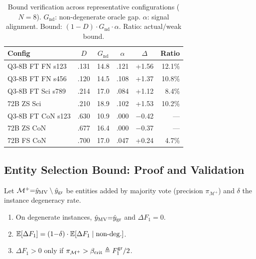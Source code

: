 \begin{table}[t]
\centering
\small
\caption{Bound verification across representative configurations ($N{=}8$). $G_{\text{nd}}$: non-degenerate oracle gap. $\alpha$: signal alignment. Bound: $(1{-}D) \cdot G_{\text{nd}} \cdot \alpha$. Ratio: actual$/$weak bound.}
\label{tab:bound_verification}
\begin{tabular}{@{}lccccr@{}}
\toprule
Config & $D$ & $G_{\text{nd}}$ & $\alpha$ & $\Delta$ & Ratio \\
\midrule
Q3-8B FT FN s123 & .131 & 14.8 & .121 & +1.56 & 12.1\% \\
Q3-8B FT FN s456 & .120 & 14.5 & .108 & +1.37 & 10.8\% \\
Q3-8B FT Sci s789 & .214 & 17.0 & .084 & +1.12 & 8.4\% \\
72B ZS Sci & .210 & 18.9 & .102 & +1.53 & 10.2\% \\
Q3-8B FT CoN s123 & .630 & 10.9 & .000 & $-$0.42 & --- \\
72B ZS CoN & .677 & 16.4 & .000 & $-$0.37 & --- \\
72B FS CoN & .700 & 17.0 & .047 & +0.24 & 4.7\% \\
\bottomrule
\end{tabular}
\end{table}

\subsection{Entity Selection Bound: Proof and Validation}\label{app:alpha_crit}

\begin{proposition}\label{prop:entity_selection_bound}
Let $\mathcal{M}^+ {=} \hat{y}_{\textup{MV}} \setminus \hat{y}_{\textup{gr}}$ be entities added by majority vote (precision $\pi_{\mathcal{M}^+}$) and $\delta$ the instance degeneracy rate.
\begin{enumerate}[label=\textup{(\alph*)},nosep,leftmargin=*]
\item On degenerate instances, $\hat{y}_{\textup{MV}} {=} \hat{y}_{\textup{gr}}$ and $\Delta F_1 {=} 0$.
\item $\mathbb{E}[\Delta F_1] = (1{-}\delta) \cdot \mathbb{E}[\Delta F_1 \mid \textup{non-deg.}]$.
\item $\Delta F_1 > 0$ only if $\pi_{\mathcal{M}^+} > \beta_{\textup{crit}} \triangleq F_1^{\textup{gr}}/2$.
\end{enumerate}
\end{proposition}

